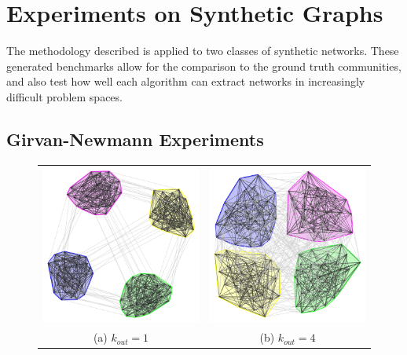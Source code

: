 \chapter{Experiments on Synthetic Graphs}

The methodology described is applied to two classes of synthetic networks. These generated benchmarks allow for the comparison to the ground truth communities, and also test how well each algorithm can extract networks in increasingly difficult problem spaces.

\section{Girvan-Newmann Experiments}
\begin{figure}
	\begin{tabular}{cc}
		\includegraphics[width=65mm]{images/girvan_kout_1_0.png} &   \includegraphics[width=65mm]{images/girvan_kout_4_0.png} \\
		(a) $k_{out}=1$ & (b) $k_{out}=4$ \\[6pt]

\end{tabular}
\end{figure}
